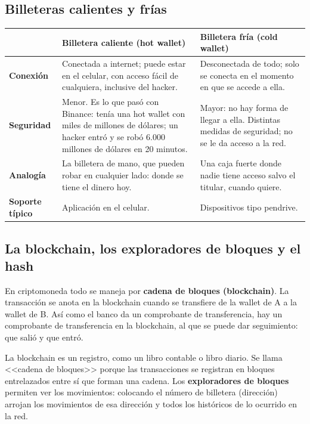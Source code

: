 \documentclass[12pt,oneside,a4paper]{book}
\begin{document}
\subsection{Billeteras calientes y frías}

\begin{longtable}{@{}>{\RaggedRight\arraybackslash}p{}>{\RaggedRight\arraybackslash}p{}>{\RaggedRight\arraybackslash}p{}@{}}
\toprule
& \textbf{Billetera caliente (hot wallet)} & \textbf{Billetera fría (cold wallet)} \\
\midrule
\endhead
\textbf{Conexión} &
Conectada a internet; puede estar en el celular, con acceso fácil de cualquiera, inclusive del hacker. &
Desconectada de todo; solo se conecta en el momento en que se accede a ella. \\
\addlinespace
\textbf{Seguridad} &
Menor. Es lo que pasó con Binance: tenía una hot wallet con miles de millones de dólares; un hacker entró y se robó 6.000 millones de dólares en 20 minutos. &
Mayor: no hay forma de llegar a ella. Distintas medidas de seguridad; no se le da acceso a la red. \\
\addlinespace
\textbf{Analogía} &
La billetera de mano, que pueden robar en cualquier lado: donde se tiene el dinero hoy. &
Una caja fuerte donde nadie tiene acceso salvo el titular, cuando quiere. \\
\addlinespace
\textbf{Soporte típico} &
Aplicación en el celular. &
Dispositivos tipo pendrive. \\
\bottomrule
\end{longtable}

\subsection{La blockchain, los exploradores de bloques y el hash}

En criptomoneda todo se maneja por \textbf{cadena de bloques (blockchain)}. La transacción se anota en la blockchain cuando se transfiere de la wallet de A a la wallet de B. Así como el banco da un comprobante de transferencia, hay un comprobante de transferencia en la blockchain, al que se puede dar seguimiento: que salió y que entró.

La blockchain es un registro, como un libro contable o libro diario. Se llama <<cadena de bloques>> porque las transacciones se registran en bloques entrelazados entre sí que forman una cadena. Los \textbf{exploradores de bloques} permiten ver los movimientos: colocando el número de billetera (dirección) arrojan los movimientos de esa dirección y todos los históricos de lo ocurrido en la red.
\end{document}
